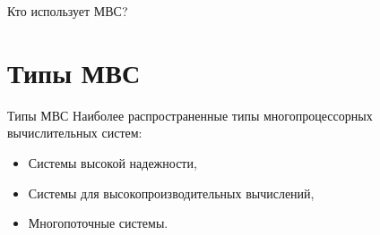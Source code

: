 \begin{frame}{Кто использует МВС?}
\begin{figure}[htpb]
\pause
\begin{minipage}[htpb]{0.3\textwidth}
\end{minipage}
\pause
\hspace*{0.05\textwidth}
\begin{minipage}[htpb]{0.25\textwidth}
\end{minipage}
\pause
\vfill
\begin{minipage}[htpb]{0.3\textwidth}
\end{minipage}
\pause
\begin{minipage}[htpb]{0.3\textwidth}
\end{minipage}
\pause
\begin{minipage}[htpb]{0.3\textwidth}
\end{minipage}
\end{figure}
\end{frame}

\section{Типы МВС}

\begin{frame}{Типы МВС}
Наиболее распространенные типы многопроцессорных вычислительных систем:
\begin{itemize}
    \item Системы высокой надежности,
    \item Системы для высокопроизводительных вычислений,
    \item Многопоточные системы.
\end{itemize}
\end{frame}

